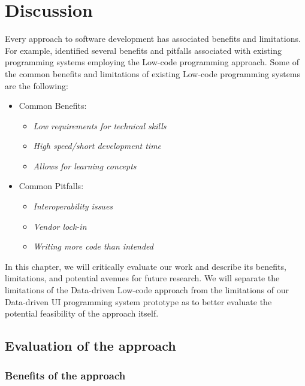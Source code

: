 \chapter{Discussion}
\label{chap:discussion}

Every approach to software development has associated benefits and limitations.
For example, \citet{Pinho_Aguiar_Amaral_2023} identified several benefits and pitfalls associated with existing programming systems employing the Low-code programming approach.
Some of the common benefits and limitations of existing Low-code programming systems are the following:
\begin{itemize}
	\item Common Benefits:
	      \begin{itemize}
		      \item \emph{Low requirements for technical skills}
		      \item \emph{High speed/short development time}
		      \item \emph{Allows for learning concepts}
	      \end{itemize}

	\item Common Pitfalls:
	      \begin{itemize}
		      \item \emph{Interoperability issues}
		      \item \emph{Vendor lock-in}
		      \item \emph{Writing more code than intended}
	      \end{itemize}
\end{itemize}

In this chapter, we will critically evaluate our work and describe its benefits, limitations, and potential avenues for future research.
We will separate the limitations of the Data-driven Low-code approach from the limitations of our Data-driven UI programming system prototype as to
better evaluate the potential feasibility of the approach itself.

\section{Evaluation of the approach}

\subsection{Benefits of the approach}

